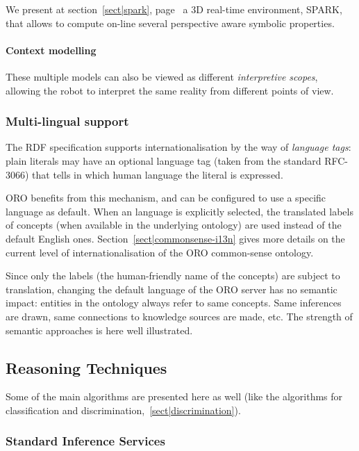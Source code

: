 We present at section~\ref{sect|spark}, page~\pageref{sect|spark} a 3D
real-time environment, SPARK, that allows to compute on-line several
perspective aware symbolic properties.

\paragraph{Context modelling}

These multiple models can also be viewed as different \emph{interpretive
scopes}, allowing the robot to interpret the same reality from different points
of view.

\subsubsection{Multi-lingual support}
\label{sect|multilingual}

The RDF specification supports internationalisation by the way of
\emph{language tags}: plain literals may have an optional language tag (taken
from the standard RFC-3066) that tells in which human language the literal is
expressed.

ORO benefits from this mechanism, and can be configured to use a specific
language as default. When an language is explicitly selected, the translated
labels of concepts (when available in the underlying ontology) are used instead
of the default English ones. Section~\ref{sect|commonsense-i13n} gives more
details on the current level of internationalisation of the ORO common-sense
ontology.

Since only the labels (\ie the human-friendly name of the concepts) are subject
to translation, changing the default language of the ORO server has no semantic
impact: entities in the ontology always refer to same concepts. Same inferences
are drawn, same connections to knowledge sources are made, etc. The strength of
semantic approaches is here well illustrated.

\subsection{Reasoning Techniques}

Some of the main algorithms are presented here as well (like the algorithms for
classification and discrimination,~\ref{sect|discrimination}).

\subsubsection{Standard Inference Services}

